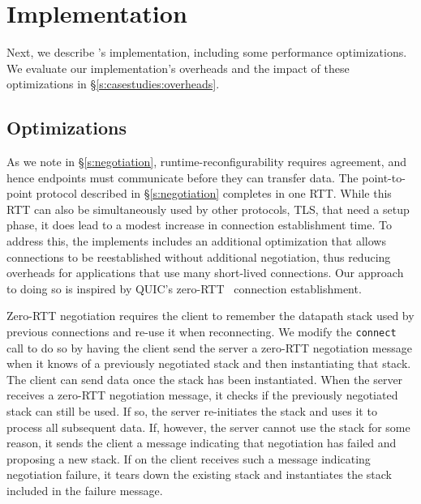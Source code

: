 \section{Implementation}\label{s:impl}
Next, we describe \name's implementation, including some performance optimizations. We evaluate our implementation's overheads and the impact of these optimizations in  \S\ref{s:casestudies:overheads}. 

\subsection{Optimizations}\label{s:impl:optimizations}

As we note in \S\ref{s:negotiation}, runtime-reconfigurability requires agreement, and hence endpoints must communicate before they can transfer data. The point-to-point protocol described in \S\ref{s:negotiation} completes in one RTT. While this RTT can also be simultaneously used by other protocols, \eg TLS, that need a setup phase, it does lead to a modest increase in connection establishment time. To address this, the \name implements includes an additional optimization that allows connections to be reestablished without additional negotiation, thus reducing overheads for applications that use many short-lived connections. Our approach to doing so is inspired by QUIC's zero-RTT~\cite{quic} connection establishment.

Zero-RTT negotiation requires the client to remember the datapath stack used by previous connections and re-use it when reconnecting. We modify the \texttt{connect} call to do so by having the client send the server a zero-RTT negotiation message when it knows of a previously negotiated stack and then instantiating that stack. The client can send data once the stack has been instantiated. When the server receives a zero-RTT negotiation message, it checks if the previously negotiated stack can still be used. If so, the server re-initiates the stack and uses it to process all subsequent data. If, however, the server cannot use the stack for some reason, it sends the client a message indicating that negotiation has failed and proposing a new stack. If \name on the client receives such a message indicating negotiation failure, it tears down the existing stack and instantiates the stack included in the failure message.



